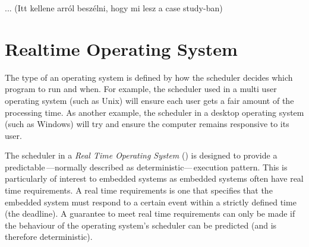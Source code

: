 ... (Itt kellene arról beszélni, hogy mi lesz a case study-ban)

\section{Realtime Operating System}

The type of an operating system is defined by how the scheduler decides which program to run and when. For example, the scheduler used in a multi user operating system (such as Unix) will ensure each user gets a fair amount of the processing time. As another example, the scheduler in a desktop operating system (such as Windows) will try and ensure the computer remains responsive to its user.

The scheduler in a \emph{Real Time Operating System} () is designed to provide a predictable\,---normally described as deterministic---\,execution pattern. This is particularly of interest to embedded systems as embedded systems often have real time requirements. A real time requirements is one that specifies that the embedded system must respond to a certain event within a strictly defined time (the deadline). A guarantee to meet real time requirements can only be made if the behaviour of the operating system's scheduler can be predicted (and is therefore deterministic).\citep{RTOS}

